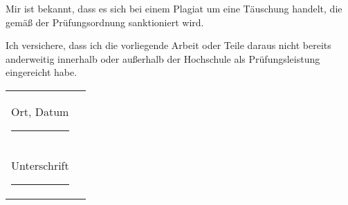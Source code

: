 \vspace{1.5em}

\noindent
Mir ist bekannt, dass es sich bei einem Plagiat um eine Täuschung handelt, die gemäß der Prüfungsordnung sanktioniert wird. \\

\vspace{1.5em}

\noindent
Ich versichere, dass ich die vorliegende Arbeit oder Teile daraus nicht bereits anderweitig innerhalb oder außerhalb der Hochschule als Prüfungsleistung eingereicht habe. \\

\vspace{2em}

\noindent
\begin{tabular}{ll}
  Ort, Datum \rule{7cm}{0.4pt} \\
  Unterschrift \rule{7cm}{0.4pt}
\end{tabular}
